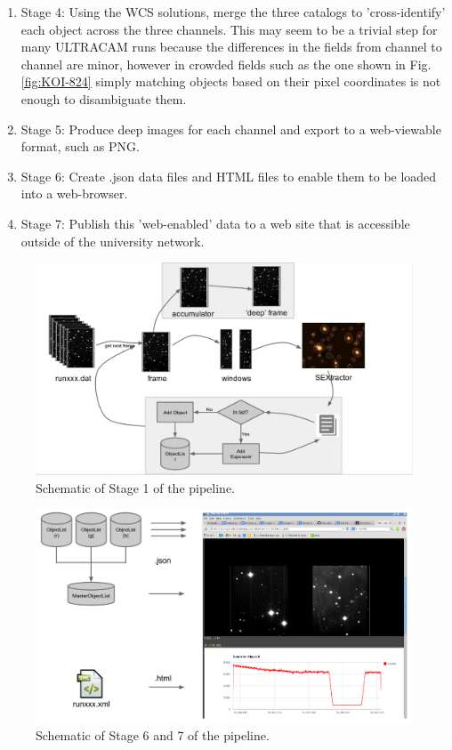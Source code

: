 \begin{enumerate}
	\item Stage 4: Using the WCS solutions, merge the three catalogs to 'cross-identify' each object across the three channels. This may seem to be a trivial step for many ULTRACAM runs because the differences in the fields from channel to channel are minor, however in crowded fields such as the one shown in Fig. \ref{fig:KOI-824} simply matching objects based on their pixel coordinates is not enough to disambiguate them.
	\item Stage 5: Produce deep images for each channel and export to a web-viewable format, such as PNG. 
	\item Stage 6: Create .json data files and HTML files to enable them to be loaded into a web-browser.
	\item Stage 7: Publish this 'web-enabled' data to a web site that is accessible outside of the university network.  
		
\end{enumerate}

\begin{figure}[!h]
	\centering
	\includegraphics[width=130mm]{images/flowchart.png}
	\caption{Schematic of Stage 1 of the pipeline.}
	\label{flowchart}
\end{figure}


\begin{figure}[!h]
	\centering
	\includegraphics[width=130mm]{images/webpublish.png}
	\caption{Schematic of Stage 6 and 7 of the pipeline.}
	\label{webpublish}
\end{figure}

